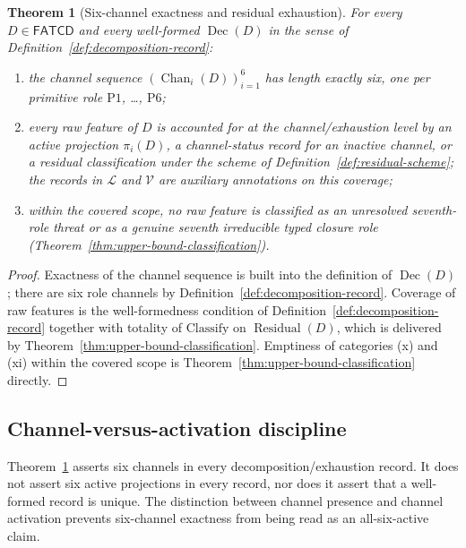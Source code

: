 \documentclass[11pt]{article}
\newtheorem{theorem}{Theorem}[section]
\theoremstyle{definition}
\newcommand{\FATCD}{\ensuremath{\mathsf{FATCD}}}
\newcommand{\Dec}[1]{\ensuremath{\operatorname{Dec}\!\left(#1\right)}}
\newcommand{\Residual}[1]{\ensuremath{\operatorname{Residual}\!\left(#1\right)}}
\newcommand{\Chan}[2]{\ensuremath{\operatorname{Chan}_{#1}\!\left(#2\right)}}
\newcommand{\Pone}{\ensuremath{\mathrm{P1}}}
\newcommand{\Psix}{\ensuremath{\mathrm{P6}}}
\begin{document}
\begin{theorem}[Six-channel exactness and residual exhaustion]\label{thm:six-channel-exactness}
For every \(D \in \FATCD{}\) and every well-formed
\(\Dec{D}\) in the sense of
Definition~\ref{def:decomposition-record}:
\begin{enumerate}[label=(\roman*),topsep=2pt,itemsep=1pt]
  \item the channel sequence \((\Chan{i}{D})_{i=1}^{6}\) has length
    exactly six, one per primitive role \Pone{}, \ldots, \Psix{};
  \item every raw feature of \(D\) is accounted for at the
    channel/exhaustion level by an active projection \(\pi_i(D)\), a
    channel-status record for an inactive channel, or a residual
    classification under the scheme of
    Definition~\ref{def:residual-scheme}; the records in \(\mathcal{L}\)
    and \(\mathcal{V}\) are auxiliary annotations on this coverage;
  \item within the covered scope, no raw feature is classified as
    an unresolved seventh-role threat or as a genuine seventh
    irreducible typed closure role
    (Theorem~\ref{thm:upper-bound-classification}).
\end{enumerate}
\end{theorem}

\begin{proof}
Exactness of the channel sequence is built into the definition of
\(\Dec{D}\); there are six role channels by
Definition~\ref{def:decomposition-record}. Coverage of raw features is
the well-formedness condition of
Definition~\ref{def:decomposition-record} together with totality of
\(\mathrm{Classify}\) on \(\Residual{D}\), which is delivered by
Theorem~\ref{thm:upper-bound-classification}. Emptiness of categories
(x) and (xi) within the covered scope is
Theorem~\ref{thm:upper-bound-classification} directly.
\end{proof}

\subsection{Channel-versus-activation discipline}\label{subsec:channel-vs-activation}

Theorem~\ref{thm:six-channel-exactness} asserts six channels in every
decomposition/exhaustion record. It does not assert six active
projections in every record, nor does it assert that a well-formed
record is unique. The distinction between channel presence and
channel activation prevents six-channel exactness from being read as
an all-six-active claim.
\end{document}
